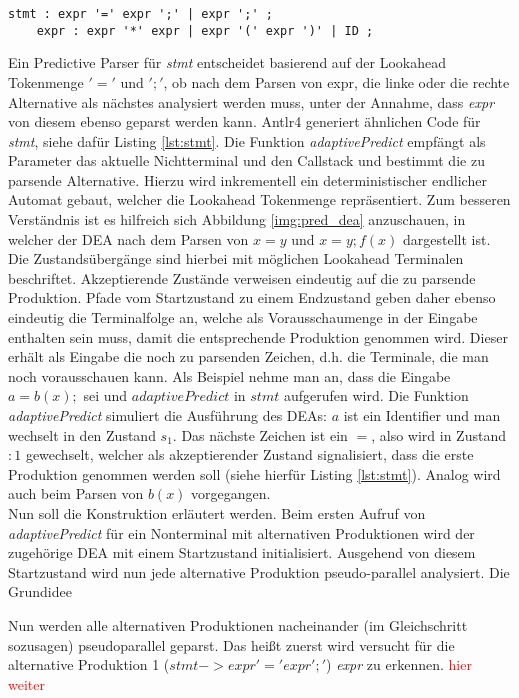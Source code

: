 \begin{lstlisting}[style=grammar, label=lst:expr_grammar]
    stmt : expr '=' expr ';' | expr ';' ;
    expr : expr '*' expr | expr '(' expr ')' | ID ;
\end{lstlisting}

Ein Predictive Parser für \textit{stmt} entscheidet basierend auf der Lookahead Tokenmenge ${'='}$ und ${';'}$, ob nach dem Parsen von expr, die linke oder die rechte Alternative
als nächstes analysiert werden muss, unter der Annahme, dass \textit{expr} von diesem ebenso geparst werden kann.
Antlr4 generiert ähnlichen Code für \textit{stmt}, siehe dafür Listing \ref{lst:stmt}.
Die Funktion \textit{adaptivePredict} empfängt als Parameter das aktuelle Nichtterminal und den Callstack und bestimmt die zu parsende Alternative.
Hierzu wird inkrementell ein deterministischer endlicher Automat gebaut, welcher die Lookahead Tokenmenge repräsentiert. 
Zum besseren Verständnis ist es hilfreich sich Abbildung \ref{img:pred_dea} anzuschauen, in welcher der DEA nach dem Parsen von $x=y$ und $x=y; f(x)$ dargestellt ist. 
Die Zustandsübergänge sind hierbei mit möglichen Lookahead Terminalen beschriftet. 
Akzeptierende Zustände verweisen eindeutig auf die zu parsende Produktion. 
Pfade vom Startzustand zu einem Endzustand geben daher ebenso eindeutig die Terminalfolge an, welche als Vorausschaumenge in der Eingabe enthalten sein muss, damit die entsprechende Produktion genommen wird. 
Dieser erhält als Eingabe die noch zu parsenden Zeichen, d.h. die Terminale, die man noch vorausschauen kann.
Als Beispiel nehme man an, dass die Eingabe $a=b(x);$ sei und $adaptivePredict$ in $stmt$ aufgerufen wird. 
Die Funktion \textit{adaptivePredict} simuliert die Ausführung des DEAs: $a$ ist ein Identifier und man wechselt in den Zustand $s_1$. Das nächste Zeichen ist ein $=$, also 
wird in Zustand $:1$ gewechselt, welcher als akzeptierender Zustand signalisiert, dass die erste Produktion genommen werden soll (siehe hierfür Listing \ref{lst:stmt}). 
Analog wird auch beim Parsen von $b(x)$ vorgegangen.\\
Nun soll die Konstruktion erläutert werden. 
Beim ersten Aufruf von \textit{adaptivePredict} für ein Nonterminal mit alternativen Produktionen wird der zugehörige DEA mit einem Startzustand initialisiert. 
Ausgehend von diesem Startzustand wird nun jede alternative Produktion pseudo-parallel analysiert.
Die Grundidee 


Nun werden alle alternativen Produktionen nacheinander (im Gleichschritt sozusagen) pseudoparallel geparst.
Das heißt zuerst wird versucht für die alternative Produktion 1 ($stmt -> expr '=' expr ';'$) \textit{expr} zu erkennen. 
\textcolor{red}{hier weiter}  


